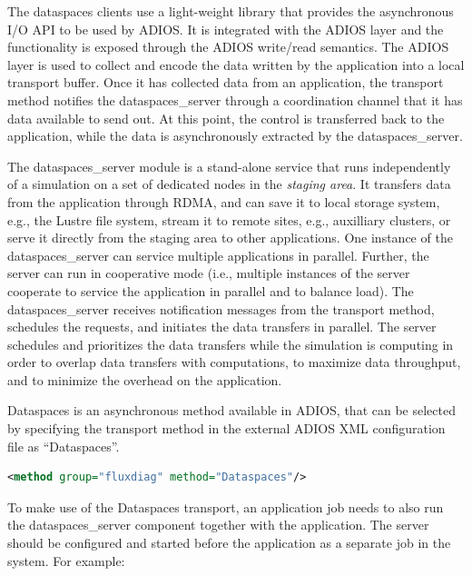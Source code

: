 The dataspaces clients use a light-weight library that provides the asynchronous
I/O API to be used by ADIOS. It is integrated with the ADIOS layer and the
functionality is exposed through the ADIOS write/read semantics. 
The ADIOS layer is used to collect and encode the data written 
by the application into a local transport buffer. Once it has collected data from 
an application, the transport method notifies the dataspaces\_server through a coordination channel 
that it has data available to send out. At this point, the control is
transferred back to the application, while the data is asynchronously extracted 
by the dataspaces\_server.

The dataspaces\_server module is a stand-alone service that runs independently of a simulation 
on a set of dedicated nodes in the 
{\em staging area}. It transfers data from the application through RDMA,  
and can save it to local storage system, e.g., the Lustre file system, stream it to 
remote sites, e.g., auxilliary clusters, or serve it directly from the staging area to 
other applications. One instance of the dataspaces\_server can service multiple applications 
 in parallel. Further, the server can run in cooperative mode (i.e., multiple 
instances of the server cooperate to service the application in parallel and to balance 
load). The dataspaces\_server receives notification messages from the transport method, schedules 
the requests, and initiates the data transfers  in parallel. The 
server schedules and prioritizes the data transfers while the simulation is computing 
in order to overlap data transfers with computations, to maximize data throughput, 
and to minimize the overhead on the application.

Dataspaces is an asynchronous method available in ADIOS, that can be selected by specifying 
the transport method in the external ADIOS XML configuration file as ``Dataspaces''.

\begin{lstlisting}[language=XML, caption=Select Dataspaces as a transport method in the configuration file example.]
<method group="fluxdiag" method="Dataspaces"/>
\end{lstlisting}

To make use of the Dataspaces transport, an application job needs to also run the dataspaces\_server 
component together with the application. The server should be configured and started 
before the application as a separate job in the system. For example:

